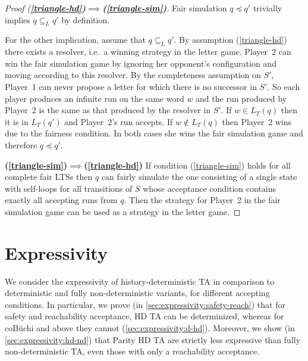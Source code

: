 \documentclass[10pt,a4paper]{amsart}
\theoremstyle{definition}
\numberwithin{equation}{section}
\newcommand{\lang}{L_T}  %
\newcommand{\langincl}[1][L]{\subseteq_{L}}
\newcommand{\fairsim}[1][]{\preceq}
\newcommand{\lts}{S}
\begin{document}
\begin{proof}[Proof (\textbf{\ref{triangle-hd})$\implies$(\ref{triangle-sim})}]
Fair simulation $q \fairsim q'$ trivially implies $q \langincl q'$ by definition.

For the other implication, assume that $q \langincl q'$.
By assumption (\ref{triangle-hd}) there exists a resolver, i.e.~a winning strategy in the letter game.
    Player~2 can win the fair simulation game by ignoring her opponent's configuration and moving according to this resolver. By the completeness assumption on $\lts'$,
    Player~1 can never propose a letter for which there is no successor in $\lts'$. So each player produces an infinite run on the same word $w$ and the run produced by Player~2 is the same as that produced by the resolver in $\lts'$. 
    If $w\in\lang(q)$ then it is in $\lang(q')$ and Player~2's run accepts.
    If $w\notin\lang(q)$ then Player~2 wins due to the fairness condition.
    In both cases she wins the fair simulation game and therefore $q \fairsim q'$.


    \textbf{(\ref{triangle-sim})$\implies$(\ref{triangle-hd})}
    If condition (\ref{triangle-sim}) holds for all complete fair LTSs then $q$ can fairly simulate the one
    consisting of a single state with self-loops for all transitions of $\lts$ whose acceptance condition contains exactly all accepting runs from $q$. Then the strategy for Player~2 in the fair simulation game
    can be used as a strategy in the letter game.
\end{proof}

	
	
	\section{Expressivity}
	\label{sec:expressivity}
We consider the expressivity of history-deterministic TA in comparison to deterministic and fully non-deterministic variants, for different accepting conditions.
In particular, we prove (in \cref{sec:expressivity:safety-reach}) 
that for safety and reachability acceptance, HD TA can be determinized,
whereas for coB\"uchi and above they cannot (\cref{sec:expressivity:d-hd}).
Moreover, we show (in \cref{sec:expressivity:hd-nd}) that Parity HD TA are strictly less expressive than fully non-deterministic TA, even those with only a reachability acceptance.
\end{document}
